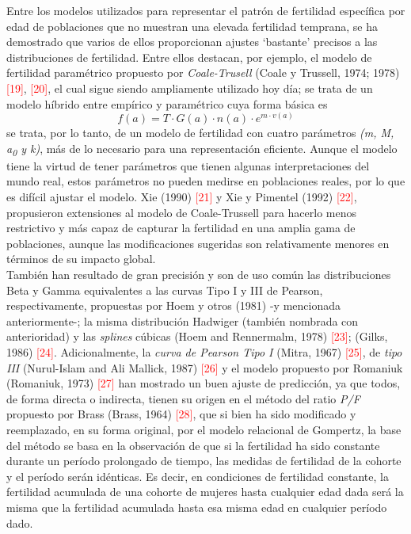Entre los modelos utilizados para representar el patrón de fertilidad específica por edad de poblaciones que no muestran una elevada fertilidad temprana, se ha demostrado que varios de ellos proporcionan ajustes `bastante' precisos a las distribuciones de fertilidad.
Entre ellos destacan, por ejemplo, el modelo de fertilidad paramétrico propuesto por \textit{Coale-Trusell} (Coale y Trussell, 1974; 1978) \textcolor{red}{[19]}, \textcolor{red}{[20]}, el cual sigue siendo ampliamente utilizado hoy día; se trata de un modelo híbrido entre empírico y paramétrico cuya forma básica es $$f(a)=T\cdot G(a)\cdot n(a)\cdot e^{m\cdot v(a)}$$ se trata, por lo tanto, de un modelo de fertilidad con cuatro parámetros \textit{(m, M, a\textsubscript{0} y k)}, más de lo necesario para una representación eficiente. Aunque el modelo tiene la virtud de tener parámetros que tienen algunas interpretaciones del mundo real, estos parámetros no pueden medirse en poblaciones reales, por lo que es difícil ajustar el modelo. Xie (1990)  \textcolor{red}{[21]} y Xie y Pimentel (1992)  \textcolor{red}{[22]}, propusieron extensiones al modelo de Coale-Trussell para hacerlo menos restrictivo y más capaz de capturar la fertilidad en una amplia gama de poblaciones, aunque las modificaciones sugeridas son relativamente menores en términos de su impacto global.\\
También han resultado de gran precisión y son de uso común las distribuciones Beta y Gamma equivalentes a las curvas Tipo I y III de Pearson, respectivamente, propuestas por Hoem y otros (1981) -y mencionada anteriormente-; la misma distribución Hadwiger (también nombrada con anterioridad) y las \textit{splines} cúbicas (Hoem and Rennermalm, 1978) \textcolor{red}{[23]}; (Gilks, 1986) \textcolor{red}{[24]}. Adicionalmente, la \textit{curva de Pearson Tipo I} (Mitra, 1967) \textcolor{red}{[25]}, de \textit{tipo III} (Nurul-Islam and Ali Mallick, 1987) \textcolor{red}{[26]} y el modelo propuesto por Romaniuk (Romaniuk, 1973) \textcolor{red}{[27]} han mostrado un buen ajuste de predicción, ya que todos, de forma directa o indirecta, tienen su origen en el método del ratio \textit{P/F} propuesto por Brass (Brass, 1964) \textcolor{red}{[28]}, que si bien ha sido modificado y reemplazado, en su forma original, por el modelo relacional de Gompertz, la base del método se basa en la observación de que si la fertilidad ha sido constante durante un período prolongado de tiempo, las medidas de fertilidad de la cohorte y el período serán idénticas. Es decir, en condiciones de fertilidad constante, la fertilidad acumulada de una cohorte de mujeres hasta cualquier edad dada será la misma que la fertilidad acumulada hasta esa misma edad en cualquier período dado.\\
